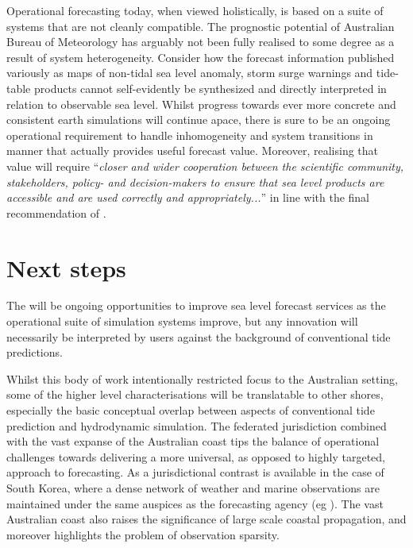 Operational forecasting today, when viewed holistically, is based on a suite of systems that are not cleanly compatible.
The prognostic potential of Australian Bureau of Meteorology has arguably not been fully realised to some degree as a result of system heterogeneity.  Consider how the forecast information published variously as maps of non-tidal sea level anomaly, storm surge warnings and tide-table products cannot self-evidently be synthesized and directly interpreted in relation to observable sea level.
Whilst progress towards ever more concrete and consistent earth simulations will continue apace, there is sure to be an ongoing operational requirement to handle inhomogeneity and system transitions in manner that actually provides useful forecast value. Moreover, realising that value will require ``\textit{closer and wider cooperation between the scientific community, stakeholders, policy- and decision-makers to ensure that sea level products are accessible and are used correctly and appropriately...}'' in line with the final recommendation of \citet{10.1175/bams-89-4-459}. 

\section{Next steps}
The will be ongoing opportunities to improve sea level forecast services as the operational suite of simulation systems improve, but any innovation will necessarily be interpreted by users against the background of conventional tide predictions.

Whilst this body of work intentionally restricted focus to the Australian setting, some of the higher level  characterisations will be translatable to other shores, especially the basic conceptual overlap between aspects of conventional tide prediction and hydrodynamic simulation.
The federated jurisdiction combined with the vast expanse of the Australian coast tips the balance of operational challenges towards delivering a more universal, as opposed to highly targeted, approach to forecasting.   As a jurisdictional contrast is available in the case of South Korea, where a dense network of weather and marine observations are maintained under the same auspices as the forecasting agency (eg   
\citep{Suh:2015fy}).
The vast Australian coast also raises the significance of large scale coastal propagation, and moreover highlights the problem of observation sparsity.


